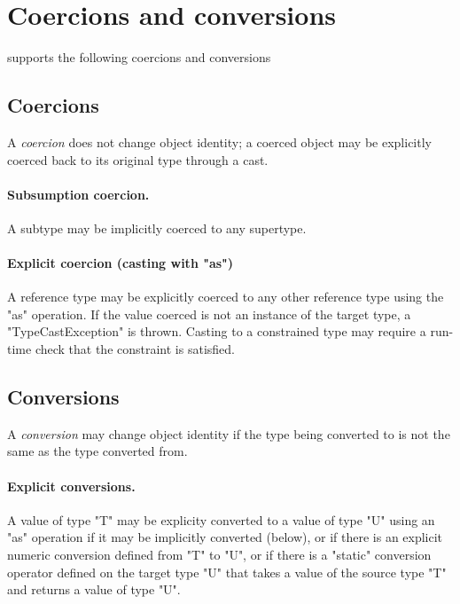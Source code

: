 \section{Coercions and conversions}
\label{XtenConversions}

\XtenCurrVer{} supports the following coercions and conversions

\subsection{Coercions}

A {\em coercion} does not change object identity;
a coerced object may be explicitly coerced back to its original
type through a cast.

\paragraph{Subsumption coercion.}
A subtype may be implicitly coerced to any supertype.

\paragraph{Explicit coercion (casting with \xcd"as")}
A reference type may be explicitly coerced to any other
reference type using the \xcd"as" operation.
If the value coerced is not an instance of the target type,
a \xcd"TypeCastException" is thrown.  Casting to a constrained
type may require a run-time check that the constraint is
satisfied.

\subsection{Conversions}

A {\em conversion} may change object identity if the type being
converted to is not the same as the type converted from.

\paragraph{Explicit conversions.}

A value of type \xcd"T" may be explicity converted to a value of type
\xcd"U" using an \xcd"as" operation if it may be implicitly
converted (below), or if there is an explicit numeric conversion defined
from \xcd"T" to \xcd"U",
or if there is a \xcd"static" conversion operator defined
on the target type \xcd"U" that takes a value of the source type
\xcd"T" and returns a value of type \xcd"U".

